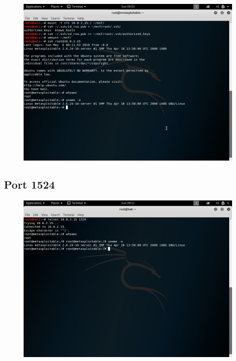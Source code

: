 \begin{figure}[H]
	\includegraphics[width=\textwidth]{images/nfs3.png}
\end{figure}

\subsection{Port 1524}

\begin{figure}[H]
	\includegraphics[width=\textwidth]{images/ingres.png}
\end{figure}

